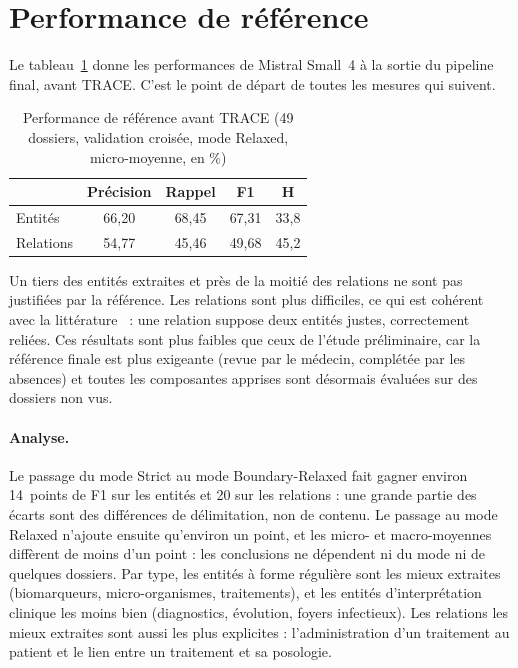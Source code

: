 \section{Performance de référence}\label{sec:c6-reference}

Le tableau~\ref{tab:c6-reference} donne les performances de Mistral Small~4 à la sortie du pipeline final, avant TRACE. C'est le point de départ de toutes les mesures qui suivent.

\begin{table}[H]
\centering
\caption{Performance de référence avant TRACE (49 dossiers, validation croisée, mode Relaxed, micro-moyenne, en \%)}\label{tab:c6-reference}
\small
\begin{tabular}{lcccc}
\toprule
& \textbf{Précision} & \textbf{Rappel} & \textbf{F1} & \textbf{H} \\
\midrule
Entités & 66,20 & 68,45 & 67,31 & 33,8 \\
Relations & 54,77 & 45,46 & 49,68 & 45,2 \\
\bottomrule
\end{tabular}
\end{table}

Un tiers des entités extraites et près de la moitié des relations ne sont pas justifiées par la référence. Les relations sont plus difficiles, ce qui est cohérent avec la littérature~\cite{wadhwa2023revisiting} : une relation suppose deux entités justes, correctement reliées. Ces résultats sont plus faibles que ceux de l'étude préliminaire, car la référence finale est plus exigeante (revue par le médecin, complétée par les absences) et toutes les composantes apprises sont désormais évaluées sur des dossiers non vus.

\paragraph{Analyse.} Le passage du mode Strict au mode Boundary-Relaxed fait gagner environ 14~points de F1 sur les entités et 20 sur les relations : une grande partie des écarts sont des différences de délimitation, non de contenu. Le passage au mode Relaxed n'ajoute ensuite qu'environ un point, et les micro- et macro-moyennes diffèrent de moins d'un point : les conclusions ne dépendent ni du mode ni de quelques dossiers. Par type, les entités à forme régulière sont les mieux extraites (biomarqueurs, micro-organismes, traitements), et les entités d'interprétation clinique les moins bien (diagnostics, évolution, foyers infectieux). Les relations les mieux extraites sont aussi les plus explicites : l'administration d'un traitement au patient et le lien entre un traitement et sa posologie.

